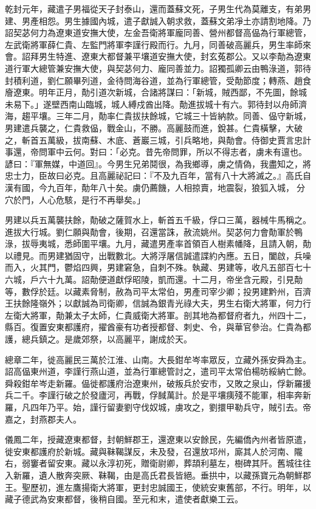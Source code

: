 \begin{pinyinscope}
 乾封元年，藏遣子男福從天子封泰山，還而蓋蘇文死，子男生代為莫離支，有弟男建、男產相怨。男生據國內城，遣子獻誠入朝求救，蓋蘇文弟凈土亦請割地降。乃詔契苾何力為遼東道安撫大使，左金吾衛將軍龐同善、營州都督高偘為行軍總管，左武衛將軍薛仁貴、左監門將軍李謹行殿而行。九月，同善破高麗兵，男生率師來會。詔拜男生特進、遼東大都督兼平壤道安撫大使，封玄菟郡公。又以李勣為遼東道行軍大總管兼安撫大使，與契苾何力、龐同善並力。詔獨孤卿云由鴨淥道，郭待封積利道，劉仁願畢列道，金待問海谷道，並為行軍總管，受勣節度；轉燕、趙食廥遼東。明年正月，勣引道次新城，合諸將謀曰：「新城，賊西鄙，不先圖，餘城未易下。」遂壁西南山臨城，城人縛戍酋出降。勣進拔城十有六。郭待封以舟師濟海，趨平壤。三年二月，勣率仁貴拔扶餘城，它城三十皆納款。同善、偘守新城，男建遣兵襲之，仁貴救偘，戰金山，不勝。高麗鼓而進，銳甚。仁貴橫擊，大破之，斬首五萬級，拔南蘇、木底、蒼巖三城，引兵略地，與勣會。侍御史賈言忠計事還，帝問軍中云何。對曰：「必克。昔先帝問罪，所以不得志者，虜未有邅也。諺曰：『軍無媒，中道回』。今男生兄弟鬩很，為我鄉導，虜之情偽，我盡知之，將忠士力，臣故曰必克。且高麗祕記曰：『不及九百年，當有八十大將滅之。』高氏自漢有國，今九百年，勣年八十矣。虜仍薦饑，人相掠賣，地震裂，狼狐入城，分穴於門，人心危駭，是行不再舉矣。」



 男建以兵五萬襲扶餘，勣破之薩賀水上，斬首五千級，俘口三萬，器械牛馬稱之。進拔大行城。劉仁願與勣會，後期，召還當誅，赦流姚州。契苾何力會勣軍於鴨淥，拔辱夷城，悉師圍平壤。九月，藏遣男產率首領百人樹素幡降，且請入朝，勣以禮見。而男建猶固守，出戰數北。大將浮屠信誠遣諜約內應。五日，闔啟，兵噪而入，火其門，鬱焰四興，男建窘急，自刺不殊。執藏、男建等，收凡五部百七十六城，戶六十九萬。詔勣便道獻俘昭陵，凱而還。十二月，帝坐含元殿，引見勣等，數俘於廷。以藏素脅制，赦為司平太常伯，男產司宰少卿；投男建黔州，百濟王扶餘隆嶺外；以獻誠為司衛卿，信誠為銀青光祿大夫，男生右衛大將軍，何力行左衛大將軍，勣兼太子太師，仁貴威衛大將軍。剖其地為都督府者九，州四十二，縣百。復置安東都護府，擢酋豪有功者授都督、刺史、令，與華官參治。仁貴為都護，總兵鎮之。是歲郊祭，以高麗平，謝成於天。



 總章二年，徙高麗民三萬於江淮、山南。大長鉗牟岑率眾反，立藏外孫安舜為主。詔高偘東州道，李謹行燕山道，並為行軍總管討之，遣司平太常伯楊昉綏納亡餘。舜殺鉗牟岑走新羅。偘徙都護府治遼東州，破叛兵於安市，又敗之泉山，俘新羅援兵二千。李謹行破之於發廬河，再戰，俘馘萬計。於是平壤痍殘不能軍，相率奔新羅，凡四年乃平。始，謹行留妻劉守伐奴城，虜攻之，劉擐甲勒兵守，賊引去。帝嘉之，封燕郡夫人。



 儀鳳二年，授藏遼東都督，封朝鮮郡王，還遼東以安餘民，先編僑內州者皆原遣，徙安東都護府於新城。藏與靺鞨謀反，未及發，召還放邛州，廝其人於河南、隴右，弱窶者留安東。藏以永淳初死，贈衛尉卿，葬頡利墓左，樹碑其阡。舊城往往入新羅，遺人散奔突厥、靺鞨，由是高氏君長皆絕。垂拱中，以藏孫寶元為朝鮮郡王。聖歷初，進左鷹揚衛大將軍，更封忠誠國王，使統安東舊部，不行。明年，以藏子德武為安東都督，後稍自國。至元和末，遣使者獻樂工云。



\end{pinyinscope}
